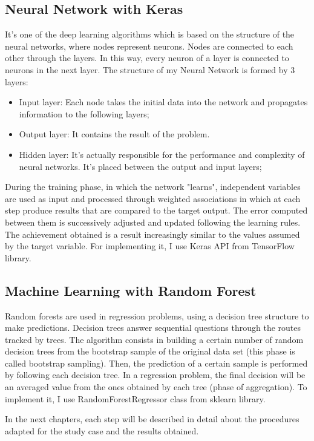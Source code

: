 \subsection{Neural Network with Keras}
It's one of the deep learning algorithms which is based on the structure of the neural networks, where nodes represent neurons.
Nodes are connected to each other through the layers. 
In this way, every neuron of a layer is connected to neurons in the next layer.
The structure of my Neural Network is formed by 3 layers:
\begin{itemize}
    \item Input layer: Each node takes the initial data into the network and propagates information to the following layers;
    \item Output layer: It contains the result of the problem. 
    \item Hidden layer: It's actually responsible for the performance and complexity of neural networks. It's placed between the output and input layers;
\end{itemize}
During the training phase, in which the network "learns", independent variables are used as input and processed through weighted associations in which at each step produce results that are compared to the target output. The error computed between them is successively adjusted and updated following the learning rules. The achievement obtained is a result increasingly similar to the values assumed by the target variable. 
For implementing it, I use Keras API from TensorFlow library.


\subsection{Machine Learning with Random Forest}
Random forests are used in regression problems, using a decision tree structure to make predictions. Decision trees answer sequential questions through the routes tracked by trees.
The algorithm consists in building a certain number of random decision trees from the bootstrap sample of the original data set (this phase is called bootstrap sampling). Then, the prediction of a certain sample is performed by following each decision tree. In a regression problem, the final decision will be an averaged value from the ones obtained by each tree (phase of aggregation).
To implement it, I use RandomForestRegressor class from sklearn library. 

\bigbreak
In the next chapters, each step will be described in detail about the procedures adapted for the study case and the results obtained.

